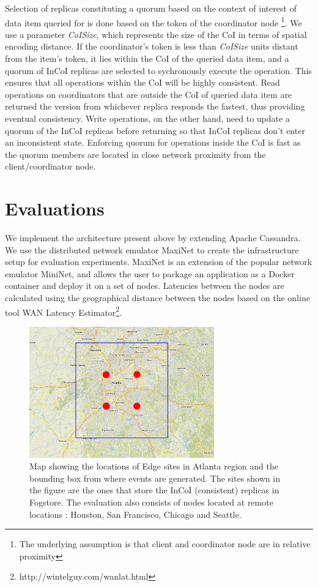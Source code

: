 Selection of replicas constituting a quorum based on the context of interest of data item queried for is done based on the token of the coordinator node \footnote{The underlying assumption is that client and coordinator node are in relative proximity}. We use a parameter \emph{CoISize}, which represents the size of the CoI in terms of spatial encoding distance.  If the coordinator's token is less than \emph{CoISize} units distant from the item's token, it lies within the CoI of the queried data item, and a quorum of InCoI replicas are selected to sychronously execute the operation. This ensures that all operations within the CoI will be highly consistent. Read operations on coordinators that are outside the CoI of queried data item are returned the version from whichever replica responds the fastest, thus providing eventual consistency. Write operations, on the other hand, need to update a quorum of the InCoI replicas before returning so that InCoI replicas don't enter an inconsistent state. Enforcing quorum for operations inside the CoI is fast as the quorum members are located in close network proximity from the client/coordinator node.

\section{Evaluations}
\label{sec:evals}
We implement the architecture present above by extending Apache Cassandra. We use the distributed network emulator MaxiNet \cite{maxinet} to create the infrastructure setup for evaluation experiments. MaxiNet is an extension of the popular network emulator MiniNet, and allows the user to package an application as a Docker container and deploy it on a set of nodes. Latencies between the nodes are calculated using the geographical distance between the nodes based on the online tool WAN Latency Estimator\footnote{http://wintelguy.com/wanlat.html}.

\begin{figure}[h]
\centering
\includegraphics[width=8cm]{figures/fogstore/evals/hotspot/map-cropped.jpg}
\caption{Map showing the locations of Edge sites in Atlanta region and the bounding box from where events are generated. The sites shown in the figure are the ones that store the InCoI (consistent) replicas in Fogstore. The evaluation also consists of nodes located at remote locations : Houston, San Francisco, Chicago and Seattle.}
\label{fig:hotspotmap}
\end{figure}

